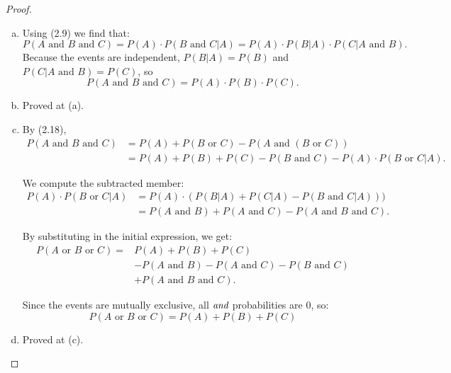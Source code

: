 \begin{proof}
    \hfill
    \begin{enumerate}[(a)]
        \item Using (2.9) we find that:
            \[
                P(A \text{ and } B \text{ and } C) = P(A) \cdot P(B \text{ and } C | A) 
                = P(A) \cdot P(B | A) \cdot P(C | A \text{ and } B)
            .\] 
            Because the events are independent, $P(B | A) = P(B)$ and $P(C | A \text { and } B) = P(C)$, so
            \begin{equation*}\tag{2.76}
                P(A \text{ and } B \text{ and } C) = P(A) \cdot P(B) \cdot P(C). 
            \end{equation*}

        \item Proved at (a).

        \item By (2.18), 
            \begin{align*}
                P(A \text{ and } B \text{ and } C) 
                    &= P(A) + P(B \text{ or } C) - P(A \text{ and } (B \text{ or } C)) \\
                    &= P(A) + P(B) + P(C) - P(B \text{ and } C) - P(A) \cdot P(B \text{ or } C | A)
            .\end{align*}

            We compute the subtracted member:
            \begin{align*}
                P(A) \cdot P(B \text{ or } C | A) 
                    &= P(A) \cdot (P(B|A) + P(C|A) - P(B \text{ and } C | A))) \\
                    &= P(A \text{ and } B) + P(A \text{ and } C) - P(A \text{ and } B \text{ and } C)
            .\end{align*}

            By substituting in the initial expression, we get:
            \begin{align*}\tag{2.79}
                P(A \text{ or } B \text{ or } C) =& P(A) + P(B) + P(C) \\
                                              &- P(A \text{ and } B) - P(A \text{ and } C) - 
                                                P(B \text{ and } C) \\
                                              &+ P(A \text{ and } B \text{ and } C)
            .\end{align*}

            Since the events are mutually exclusive, all $\emph{and}$ probabilities are 0, so:
            \begin{equation*}\tag{2.78}
                P(A \text{ or } B \text{ or } C) = P(A) + P(B) + P(C)
            \end{equation*}

        \item Proved at (c).
    \end{enumerate}
\end{proof}

